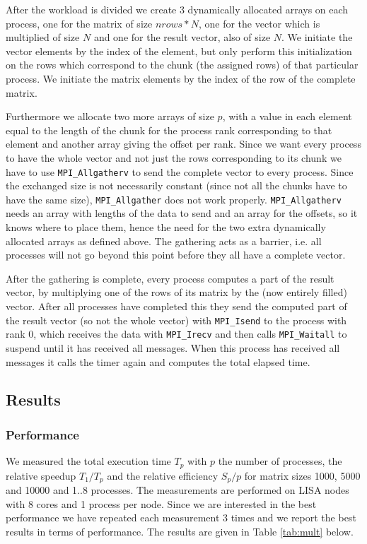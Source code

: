 \documentclass[11pt,a4paper,onecolumn]{article}
\begin{document}
After the workload is divided we create 3 dynamically allocated arrays on each process, one for the matrix of size $nrows * N$, one for the vector which is multiplied of size $N$ and one for the result vector, also of size $N$. We initiate the vector elements by the index of the element, but only perform this initialization on the rows which correspond to the chunk (the assigned rows) of that particular process. We initiate the matrix elements by the index of the row of the complete matrix.

Furthermore we allocate two more arrays of size $p$, with a value in each element equal to the length of the chunk for the process rank corresponding to that element and another array giving the offset per rank. Since we want every process to have the whole vector and not just the rows corresponding to its chunk we have to use \texttt{MPI\_Allgatherv} to send the complete vector to every process. Since the exchanged size is not necessarily constant (since not all the chunks have to have the same size), \texttt{MPI\_Allgather} does not work properly. \texttt{MPI\_Allgatherv} needs an array with lengths of the data to send and an array for the offsets, so it knows where to place them, hence the need for the two extra dynamically allocated arrays as defined above. The gathering acts as a barrier, i.e. all processes will not go beyond this point before they all have a complete vector.

After the gathering is complete, every process computes a part of the result vector, by multiplying one of the rows of its matrix by the (now entirely filled) vector. After all processes have completed this they send the computed part of the result vector (so not the whole vector) with \texttt{MPI\_Isend} to the process with rank 0, which receives the data with \texttt{MPI\_Irecv} and then calls \texttt{MPI\_Waitall} to suspend until it has received all messages. When this process has received all messages it calls the timer again and computes the total elapsed time.

\subsection{Results}
\subsubsection{Performance}
We measured the total execution time $T_p$ with $p$ the number of processes, the relative speedup $T_1/T_p$ and the relative efficiency $S_p/p$ for matrix sizes 1000, 5000 and 10000 and 1..8 processes. The measurements are performed on LISA nodes with 8 cores and 1 process per node. Since we are interested in the best performance we have repeated each measurement 3 times and we report the best results in terms of performance. The results are given in Table \ref{tab:mult} below.
\end{document}
